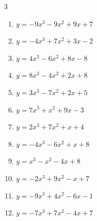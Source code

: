 \begin{multicols}{3}
\begin{enumerate}
  \item $y=-9x^{3}-9x^{2}+9x+7$


  \item $y=-4x^{3}+7x^{2}+3x-2$


  \item $y=4x^{3}-6x^{2}+8x-8$


  \item $y=8x^{3}-4x^{2}+2x+8$


  \item $y=3x^{3}-7x^{2}+2x+5$


  \item $y=7x^{3}+x^{2}+9x-3$


  \item $y=2x^{3}+7x^{2}+x+4$


  \item $y=-4x^{3}-6x^{2}+x+8$


  \item $y=x^{3}-x^{2}-4x+8$


  \item $y=-2x^{3}+9x^{2}-x+7$


  \item $y=-9x^{3}+4x^{2}-6x-1$


\columnbreak %

  \item $y=-7x^{3}+7x^{2}-4x+7$



\end{enumerate}
\end{multicols}
